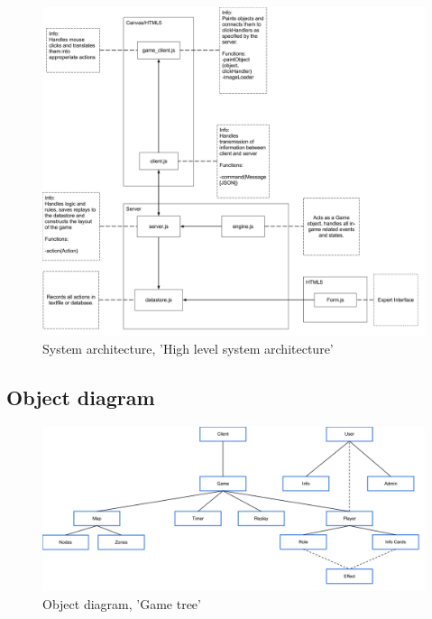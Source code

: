 \begin{figure}[H]
  \centering
    \includegraphics[width=1.0\textwidth]{img/highlevelarch.png}
  \caption{System architecture, 'High level system architecture'} 
  \label{fig:highsysarch}
\end{figure}

\subsection{Object diagram}

\begin{figure}[H]
  \centering
    \includegraphics[width=1.0\textwidth]{img/GameTree.png}
  \caption{Object diagram, 'Game tree'} 
  \label{fig:gametree}
\end{figure}


